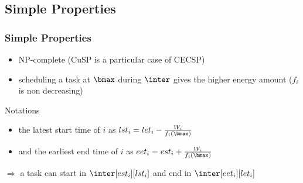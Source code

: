 \subsection{Simple Properties}
\begin{frame}
  \frametitle{Simple Properties}
  \begin{itemize}
\vfill
  \item NP-complete (CuSP is a particular case of CECSP)
\vfill
\pause
  \item scheduling a task at $\bmax$ during $\inter$ gives the higher energy amount ($f_i$ is non decreasing)
\vfill
\end{itemize}
\begin{center}
\end{center}
\pause
\vfill
  \begin{block}{Notations}
    \begin{itemize}
    \item the latest start time of $i$ as $lst_i=let_i-\frac{W_i}{f_i(\bmax)}$
    \item and the earliest end time of $i$ as $eet_i=est_i+\frac{W_i}{f_i(\bmax)}$
    \end{itemize}
  \end{block}
\vfill
\pause

  $\Rightarrow$ a task can start in $\inter[est_i][lst_i]$ and end in $\inter[eet_i][let_i]$
\vfill
\end{frame}
